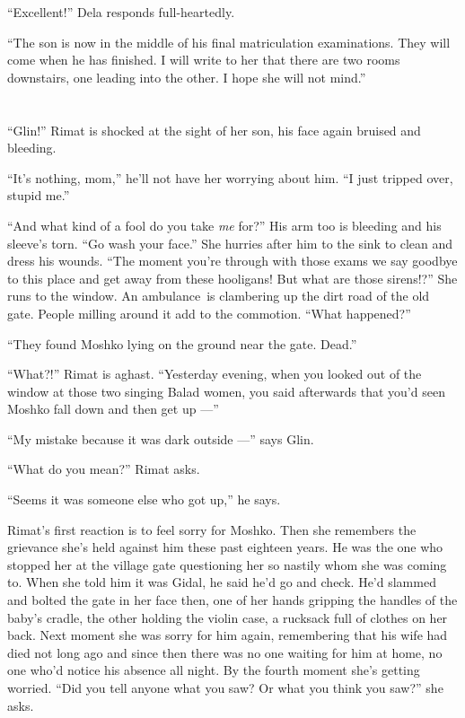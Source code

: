 \documentclass[twoside,11pt]{book}
\begin{document}
``Excellent!'' Dela responds full-heartedly.

{}``The son is now in the middle of his final matriculation examinations. They will come when he has finished. I will
write to her that there are two rooms downstairs, one leading into the other. I hope she will not mind.''


\bigskip

\chapter{}

``Glin!'' Rimat is shocked at the sight of her son, his face again bruised and bleeding.

``It's nothing, mom,'' he'll not have her worrying about him. ``I just tripped over, stupid
me.''

``And what kind of a fool do you take \textit{me} for?'' His arm too is bleeding and his
sleeve's torn. ``Go wash your face.'' She hurries after him to the sink to clean and dress
his wounds. ``The moment you're through with those exams we say goodbye to this place and get away from
these hooligans! But what are those sirens!?'' She runs to the window. An ambulance~is clambering up the
dirt road of the old gate. People milling around it add to the commotion. ``What happened?''

``They found Moshko lying on the ground near the gate. Dead.''

``What?!'' Rimat is aghast. ``Yesterday evening, when you
looked out of the window at those two singing Balad women, you said afterwards that you'd seen Moshko fall down and
then get up ---''

``My mistake because it was dark outside ---'' says Glin.

``What do you mean?'' Rimat asks.

``Seems it was someone else who got up,'' he says.

Rimat's first reaction is to feel sorry for Moshko. Then she remembers the grievance she's held against him these
past{ }eighteen years. He was the one who stopped her at the village gate questioning her so nastily
whom she was coming to. When she told him it was Gidal, he said he'd go and check. He'd slammed and bolted the gate in
her face then, one of her hands gripping the handles of the baby's cradle, the other holding the violin case, a
rucksack full of clothes on her back. Next moment she was sorry for him again, remembering that  his wife had died not
long ago and since then there was no one waiting for him at home, no one who'd notice his absence all night. By the
fourth moment she's getting worried. ``Did you tell anyone what you saw? Or what you think you
saw?''  she asks.
\end{document}
